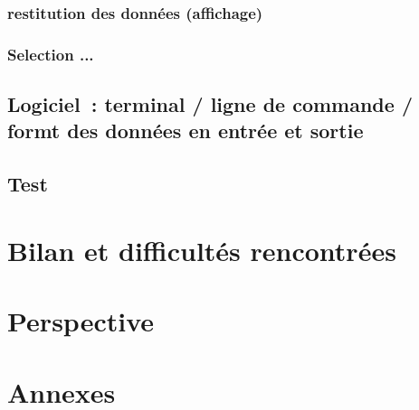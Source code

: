 \documentclass[oneside,13pt,a4paper]{report}
\begin{document}
            \subsection{restitution des données (affichage)}

            \subsection{Selection ...}

        \section{Logiciel : terminal / ligne de commande / formt des données en entrée et sortie}

        \section{Test}



    \chapter{Bilan et difficultés rencontrées}


    \chapter{Perspective}


    \chapter{Annexes}
\end{document}
